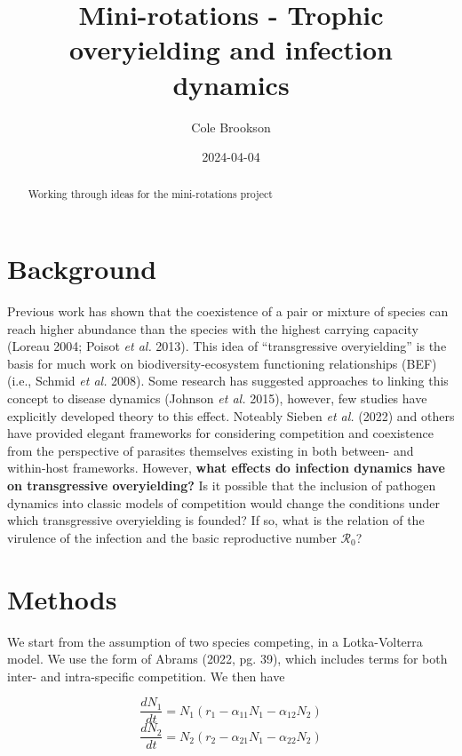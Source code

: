 \documentclass[
  letterpaper,
  DIV=11,
  numbers=noendperiod]{scrartcl}
\title{Mini-rotations - Trophic overyielding and infection dynamics}
\author{Cole Brookson}
\date{2024-04-04}
\renewcommand*\contentsname{Table of contents}
\newcommand\contentsname{Table of contents}
\begin{document}
\maketitle
\begin{abstract}
Working through ideas for the mini-rotations project
\end{abstract}

\renewcommand*\contentsname{Table of contents}
{
\hypersetup{linkcolor=}
\setcounter{tocdepth}{3}
\tableofcontents
}
\section{Background}

Previous work has shown that the coexistence of a pair or mixture of
species can reach higher abundance than the species with the highest
carrying capacity (Loreau 2004; Poisot \emph{et al.} 2013). This idea of
``transgressive overyielding'' is the basis for much work on
biodiversity-ecosystem functioning relationships (BEF) (i.e., Schmid
\emph{et al.} 2008). Some research has suggested approaches to linking
this concept to disease dynamics (Johnson \emph{et al.} 2015), however,
few studies have explicitly developed theory to this effect. Noteably
Sieben \emph{et al.} (2022) and others have provided elegant frameworks
for considering competition and coexistence from the perspective of
parasites themselves existing in both between- and within-host
frameworks. However,
\textbf{what effects do infection dynamics have on transgressive overyielding?}
Is it possible that the inclusion of pathogen dynamics into classic
models of competition would change the conditions under which
transgressive overyielding is founded? If so, what is the relation of
the virulence of the infection and the basic reproductive number
\(\mathcal{R_0}\)?

\section{Methods}

We start from the assumption of two species competing, in a
Lotka-Volterra model. We use the form of Abrams (2022, pg. 39), which
includes terms for both inter- and intra-specific competition. We then
have

\begin{equation}
  \label{eqn:simple-lv-1}
  \frac{dN_1}{dt} = N_1(r_1 - \alpha_{11}N_1 - \alpha_{12}N_2)
\end{equation} \begin{equation}
  \label{eqn:simple-lv-2}
  \frac{dN_2}{dt} = N_2(r_2 - \alpha_{21}N_1 - \alpha_{22}N_2)
\end{equation}
\end{document}

